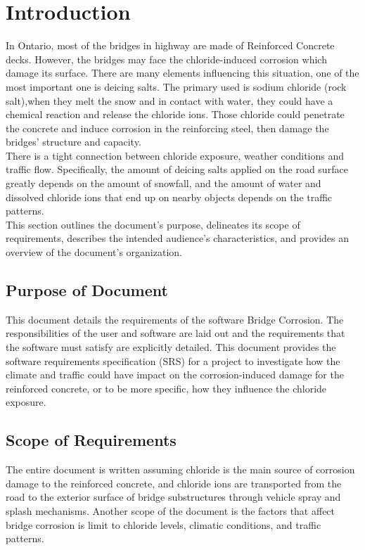 \documentclass[12pt]{article}
\begin{document}
\section{Introduction}
In Ontario, most of the bridges in highway are made of Reinforced Concrete decks. However, the bridges may face the chloride-induced corrosion which damage its surface. There are many elements influencing this situation, one of the most important one is deicing salts. The primary used is sodium chloride (rock salt),when they melt the snow and in contact with water, they could have a chemical reaction and release the chloride ions. Those chloride could penetrate the concrete and induce corrosion in the reinforcing steel, then damage the bridges’ structure and capacity. \\
There is a tight connection between chloride exposure, weather conditions and traffic flow. Specifically, the amount of deicing salts applied on the road surface greatly depends on the amount of snowfall, and the amount of water and dissolved chloride ions that end up on nearby objects depends on the traffic patterns.\\
This section outlines the document's purpose, delineates its scope of requirements, describes the intended audience's characteristics, and provides an overview of the document's organization.

\subsection{Purpose of Document}
This document details the requirements of the software Bridge Corrosion. The
responsibilities of the user and software are laid out and the requirements that the software must satisfy are explicitly detailed. This document provides the software requirements specification (SRS) for a project to investigate how the climate and traffic could have impact on the corrosion-induced damage for the reinforced concrete, or to be more specific, how they influence the chloride exposure. 

\subsection{Scope of Requirements} 
The entire document is written assuming chloride is the main source of corrosion damage to the reinforced concrete, and chloride ions are transported from the road to the exterior surface of bridge substructures through vehicle spray and splash mechanisms. Another scope of the document is the factors that affect bridge corrosion is limit to chloride levels, climatic conditions, and traffic patterns.
\end{document}
